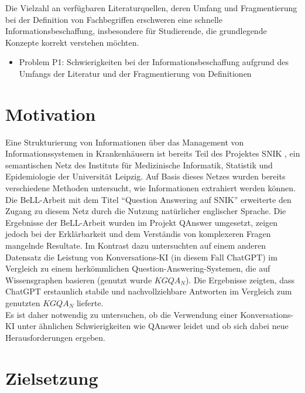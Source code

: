 Die Vielzahl an verfügbaren Literaturquellen, deren Umfang und Fragmentierung bei der Definition von Fachbegriffen
erschweren eine schnelle Informationsbeschaffung, insbesondere für Studierende, die grundlegende Konzepte korrekt verstehen möchten. \\

\begin{itemize}
  \item Problem P1: Schwierigkeiten bei der Informationsbeschaffung aufgrund des Umfangs der Literatur und der Fragmentierung von Definitionen
\end{itemize}

\section{Motivation}

Eine Strukturierung von Informationen über das Management von Informationssystemen in Krankenhäusern ist bereits Teil des Projektes SNIK \citep{semantischesnetz}, 
ein semantischen Netz des Instituts für Medizinische Informatik, Statistik und Epidemiologie der Universität Leipzig.
Auf Basis dieses Netzes wurden bereits verschiedene Methoden untersucht, wie Informationen extrahiert werden können.\\

Die BeLL-Arbeit mit dem Titel \enquote{Question Answering auf SNIK} \citep{hannesbell} erweiterte den Zugang zu diesem Netz durch die Nutzung natürlicher englischer Sprache. 
Die Ergebnisse der BeLL-Arbeit wurden im Projekt QAnswer \citep{qanswer} umgesetzt, zeigen jedoch bei der Erklärbarkeit und dem Verständis von komplexeren Fragen mangelnde Resultate. 
Im Kontrast dazu untersuchten \citet{chatgpt_qas} auf einem anderen Datensatz die Leistung von Konversations-KI (in diesem Fall ChatGPT) im Vergleich zu einem herkömmlichen Question-Answering-Systemen, die auf Wissensgraphen basieren (genutzt wurde $KGQA_N$). 
Die Ergebnisse zeigten, dass ChatGPT erstaunlich stabile und nachvollziehbare Antworten im Vergleich zum genutzten $KGQA_N$ lieferte.\\

Es ist daher notwendig zu untersuchen, ob die Verwendung einer Konversations-KI unter ähnlichen Schwierigkeiten wie QAnswer leidet und ob sich dabei neue Herausforderungen ergeben.

\section{Zielsetzung}\label{sec:zielsetzung}

